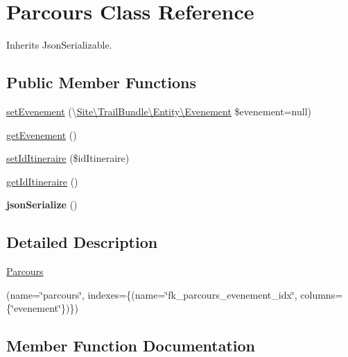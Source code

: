 \hypertarget{class_site_1_1_trail_bundle_1_1_entity_1_1_parcours}{}\section{Parcours Class Reference}
\label{class_site_1_1_trail_bundle_1_1_entity_1_1_parcours}


Inherits Json\+Serializable.

\subsection*{Public Member Functions}
\begin{DoxyCompactItemize}
\item 
\hyperlink{class_site_1_1_trail_bundle_1_1_entity_1_1_parcours_a6ed044dcb38f66a09b105075b59bd8ed}{set\+Evenement} (\textbackslash{}\hyperlink{class_site_1_1_trail_bundle_1_1_entity_1_1_evenement}{Site\textbackslash{}\+Trail\+Bundle\textbackslash{}\+Entity\textbackslash{}\+Evenement} \$evenement=null)
\item 
\hyperlink{class_site_1_1_trail_bundle_1_1_entity_1_1_parcours_a0d200fcb8e70d13b45e20baf2269ed3f}{get\+Evenement} ()
\item 
\hyperlink{class_site_1_1_trail_bundle_1_1_entity_1_1_parcours_ac6d856c1703171a1e82c5cb2256cfcb5}{set\+Id\+Itineraire} (\$id\+Itineraire)
\item 
\hyperlink{class_site_1_1_trail_bundle_1_1_entity_1_1_parcours_a406b006ba2dbcdd4555a1400b625f82f}{get\+Id\+Itineraire} ()
\item 
\hypertarget{class_site_1_1_trail_bundle_1_1_entity_1_1_parcours_ad402d8679325bc514874370f02b5c2ac}{}{\bfseries json\+Serialize} ()\label{class_site_1_1_trail_bundle_1_1_entity_1_1_parcours_ad402d8679325bc514874370f02b5c2ac}

\end{DoxyCompactItemize}


\subsection{Detailed Description}
\hyperlink{class_site_1_1_trail_bundle_1_1_entity_1_1_parcours}{Parcours}

(name=\char`\"{}parcours\char`\"{}, indexes=\{(name=\char`\"{}fk\+\_\+parcours\+\_\+evenement\+\_\+idx\char`\"{}, columns=\{\char`\"{}evenement\char`\"{}\})\})  

\subsection{Member Function Documentation}
\hypertarget{class_site_1_1_trail_bundle_1_1_entity_1_1_parcours_a0d200fcb8e70d13b45e20baf2269ed3f}{}
